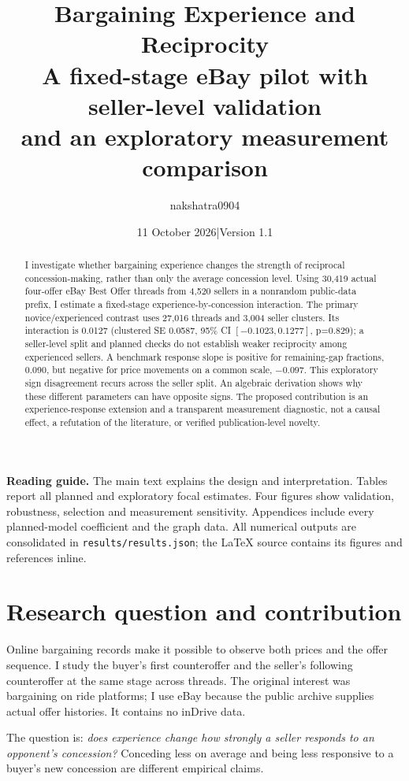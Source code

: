 \documentclass[11pt,a4paper]{article}
\title{\textbf{Bargaining Experience and Reciprocity}\\[5pt]\large A fixed-stage eBay pilot with seller-level validation\\and an exploratory measurement comparison}
\author{nakshatra0904}
\date{11 October 2026\quad |\quad Version 1.1}
\begin{document}
\maketitle
\begin{abstract}
I investigate whether bargaining experience changes the strength of
reciprocal concession-making, rather than only the average concession level.
Using 30,419 actual four-offer eBay Best Offer threads from 4,520 sellers in a
nonrandom public-data prefix, I estimate a fixed-stage experience-by-concession
interaction. The primary novice/experienced contrast uses 27,016 threads and
3,004 seller clusters. Its interaction is 0.0127 (clustered SE 0.0587,
95\% CI $[-0.1023,0.1277]$, p=0.829); a seller-level split and planned checks
do not establish weaker reciprocity among experienced sellers. A benchmark
response slope is positive for remaining-gap fractions, 0.090, but negative
for price movements on a common scale, $-0.097$. This exploratory sign
disagreement recurs across the seller split. An algebraic derivation shows
why these different parameters can have opposite signs. The proposed
contribution is an experience-response extension and a transparent measurement
diagnostic, not a causal effect, a refutation of the literature, or verified
publication-level novelty.
\end{abstract}
\textbf{Reading guide.} The main text explains the design and interpretation.
Tables report all planned and exploratory focal estimates. Four figures show
validation, robustness, selection and measurement sensitivity. Appendices
include every planned-model coefficient and the graph data. All numerical
outputs are consolidated in \texttt{results/results.json}; the LaTeX source
contains its figures and references inline.
\clearpage
\tableofcontents
\clearpage
\section{Research question and contribution}
Online bargaining records make it possible to observe both prices and the
offer sequence. I study the buyer's first counteroffer and the
seller's following counteroffer at the same stage across threads. The original
interest was bargaining on ride platforms; I use eBay because
the public archive supplies actual offer histories. It contains no inDrive data.

The question is: \emph{does experience change how strongly a seller responds
to an opponent's concession?} Conceding less on average and being less
responsive to a buyer's new concession are different empirical claims.
\end{document}

